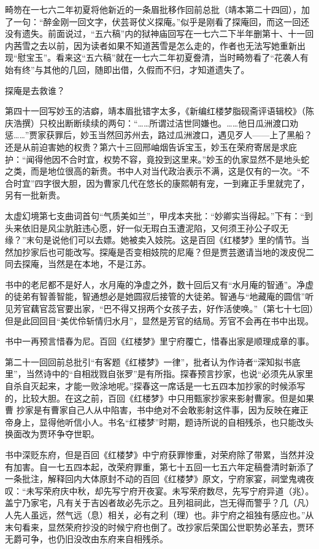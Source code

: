 \par 畸笏在一七六二年初夏将他新近的一条眉批移作回前总批（靖本第二十四回），加了一句：“醉金刚一回文字，伏芸哥仗义探庵。”似乎是刚看了探庵回，而这一回还没有遗失。前面说过，“五六稿”内的狱神庙回写在一七六二下半年删第十、十一回内茜雪之去以前，因为读者如果不知道茜雪是怎么走的，作者也无法写她重新出现“慰宝玉”。看来这“五六稿”就在一七六二年初夏誊清，当时畸笏看了“花袭人有始有终”与其他的几回，随即出借，久假而不归，才知道遗失了。
\par 探庵是去救谁？
\par 第四十一回写妙玉的洁癖，靖本眉批错字太多，《新编红楼梦脂砚斋评语辑校》（陈庆浩撰）只校出断断续续的两句：“……所谓过洁世同嫌也。……他日瓜洲渡口劝惩……”贾家获罪后，妙玉当然回苏州去，路过瓜洲渡口，遇见歹人——上了黑船？还是从前迫害她的权贵？第六十三回邢岫烟告诉宝玉，妙玉在荣府寄居是求庇护：“闻得他因不合时宜，权势不容，竟投到这里来。”妙玉的仇家显然不是地头蛇之类，而是地位很高的新贵。书中人对当代政治表示不满，这是仅有的一次。“不合时宜”四字很大胆，因为曹家几代在悠长的康熙朝有宠，一到雍正手里就完了，另有一批新贵。
\par 太虚幻境第七支曲词首句“气质美如兰”，甲戌本夹批：“妙卿实当得起。”下有：“到头来依旧是风尘肮脏违心愿，好一似无瑕白玉遭泥陷，又何须王孙公子叹无缘？”末句是说他们可以去嫖。她被卖入妓院。这是百回《红楼梦》里的情节。当然加抄家后也可能改写。探庵是否变相妓院的尼庵？但是贾芸邀请当地的泼皮倪二同去探庵，当然是在本地，不是江苏。
\par 书中的老尼都不是好人，水月庵的净虚之外，数十回后又有“水月庵的智通”。净虚的徒弟有智善智能，智通想必是她圆寂后接管的大徒弟。智通与“地藏庵的圆信”听见芳官藕官蕊官要出家，“巴不得又拐两个女孩子去，好作活使唤。”（第七十七回）但是此回回目“美优伶斩情归水月”，显然是芳官的结局。芳官不会再在书中出现。
\par 书中一再预言惜春为尼。百回《红楼梦》里宁府覆亡，惜春出家是顺理成章的事。
\par 第二十一回回前总批引“有客题《红楼梦》一律”，批者认为作诗者“深知拟书底里”，当然诗中的“自相戕戮自张罗”是有所指。探春预言抄家，也说“必须先从家里自杀自灭起来，才能一败涂地呢。”探春这一席话是一七五四本加抄家的时候添写的，比较大胆。在这之前，百回《红楼梦》中只用甄家抄家来影射曹家。但是如果曹 抄家是有曹家自己人从中陷害，书中绝对不会敢影射这件事，因为反映在雍正帝身上，显得他听信小人。书名“红楼梦”时期，题诗所说的自相残杀，也只能改头换面改为贾环争夺世职。
\par 书中深贬东府，但是百回《红楼梦》中宁府获罪惨重，对荣府除了带累，当然并没有加害。自一七五四本起，改荣府罪重，第七十五回一七五六年定稿誊清时新添了一条批注，解释回内大体原封不动的百回《红楼梦》原文，宁府家宴，祠堂鬼魂夜叹：“未写荣府庆中秋，却先写宁府开夜宴。未写荣府数尽，先写宁府异道（兆）。盖宁乃家宅，凡有关于吉凶者故必先示之。且列祖祠此，岂无得而警乎？几（凡）人先人虽远，然气远（息）相关，必有之利（理）也。非宁府之祖独有感应也。”从末句看来，显然荣府抄没的时候宁府也倒了。改抄家后荣国公世职势必革去，贾环无爵可争，也仍旧没改由东府来自相残杀。
